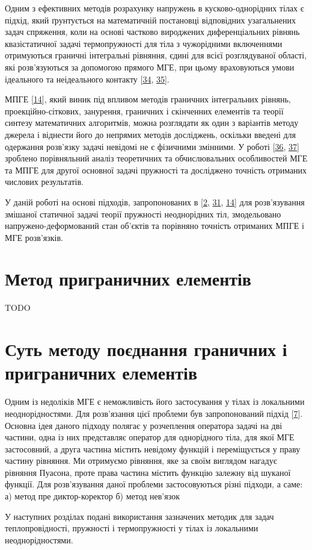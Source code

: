 Одним з ефективних методів розрахунку напружень в кусково-однорідних
тілах є підхід, який ґрунтується на математичній постановці відповідних
узагальнених задач спряження, коли на основі частково вироджених
диференціальних рівнянь квазістатичної задачі термопружності для тіла з
чужорідними включеннями отримуються граничні інтегральні рівняння, єдині
для всієї розглядуваної області, які розв'язуються за допомогою прямого
МГЕ, при цьому враховуються умови ідеального та неідеального контакту
{[}\protect\hyperlink{anchor-22}{34},
\protect\hyperlink{anchor-23}{35}{]}.

МПГЕ {[}\protect\hyperlink{anchor-24}{14}{]}, який виник під впливом
методів граничних інтегральних рівнянь, проекційно-сіткових, занурення,
граничних і скінченних елементів та теорії синтезу математичних
алгоритмів, можна розглядати як один з варіантів методу джерела і
віднести його до непрямих методів досліджень, оскільки введені для
одержання розв'язку задачі невідомі не є фізичними змінними. У роботі
{[}\protect\hyperlink{anchor-25}{36},
\protect\hyperlink{anchor-26}{37}{]} зроблено порівняльний аналіз
теоретичних та обчислювальних особливостей МГЕ та МПГЕ для другої
основної задачі пружності та досліджено точність отриманих числових
результатів.

У даній роботі на основі підходів, запропонованих в
{[}\protect\hyperlink{anchor-2}{2}, \protect\hyperlink{anchor-19}{31},
\protect\hyperlink{anchor-24}{14}{]} для розв'язу­вання змішаної
статичної задачі теорії пружності неоднорідних тіл, змодельовано
напружено-деформований стан об'єктів та порів­няно точ­ність отриманих
МПГЕ і МГЕ розв'язків.

\section{Метод приграничних елементів}

TODO

\section{Суть методу поєднання граничних і приграничних елементів}

Одним із недоліків МГЕ є неможливість його застосування у тілах із
локальними неоднорідностями. Для розв'язання цієї проблеми був
запропонований підхід {[}\protect\hyperlink{anchor-5}{7}{]}. Основна
ідея даного підходу полягає у розчеплення оператора задачі на дві
частини, одна із них представляє оператор для однорідного тіла, для якої
МГЕ застосовний, а друга частина містить невідому функцій і
переміщується у праву частину рівняння. Ми отримуємо рівняння, яке за
своїм виглядом нагадує рівняння Пуасона, проте права частина містить
функцію залежну від шуканої функції. Для розв'язування даної проблеми
застосовуються різні підходи, а саме: а) метод пре диктор-коректор б)
метод нев'язок

У наступних розділах подані використання зазначених методик для задач
теплопровідності, пружності і термопружності у тілах із локальними
неоднорідностями.

